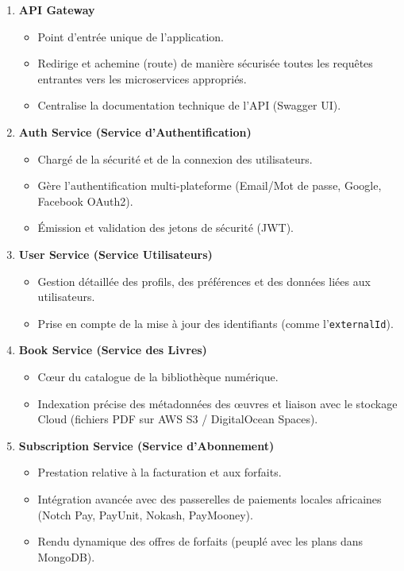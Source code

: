\documentclass[12pt,a4paper]{article}
\begin{document}
\begin{enumerate}[label=\textbf{\arabic*.}]
    \item \textbf{API Gateway}
    \begin{itemize}
        \item Point d'entrée unique de l'application.
        \item Redirige et achemine (route) de manière sécurisée toutes les requêtes entrantes vers les microservices appropriés.
        \item Centralise la documentation technique de l'API (Swagger UI).
    \end{itemize}

    \item \textbf{Auth Service (Service d'Authentification)}
    \begin{itemize}
        \item Chargé de la sécurité et de la connexion des utilisateurs.
        \item Gère l'authentification multi-plateforme (Email/Mot de passe, Google, Facebook OAuth2).
        \item Émission et validation des jetons de sécurité (JWT).
    \end{itemize}

    \item \textbf{User Service (Service Utilisateurs)}
    \begin{itemize}
        \item Gestion détaillée des profils, des préférences et des données liées aux utilisateurs.
        \item Prise en compte de la mise à jour des identifiants (comme l'\texttt{externalId}).
    \end{itemize}

    \item \textbf{Book Service (Service des Livres)}
    \begin{itemize}
        \item Cœur du catalogue de la bibliothèque numérique.
        \item Indexation précise des métadonnées des œuvres et liaison avec le stockage Cloud (fichiers PDF sur AWS S3 / DigitalOcean Spaces).
    \end{itemize}

    \item \textbf{Subscription Service (Service d'Abonnement)}
    \begin{itemize}
        \item Prestation relative à la facturation et aux forfaits.
        \item Intégration avancée avec des passerelles de paiements locales africaines (Notch Pay, PayUnit, Nokash, PayMooney).
        \item Rendu dynamique des offres de forfaits (peuplé avec les plans dans MongoDB).
    \end{itemize}


\end{enumerate}
\end{document}
